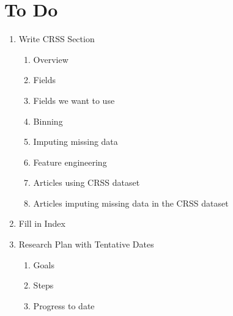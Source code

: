 \section{To Do}

\begin{enumerate}
	\item Write CRSS Section
	\begin{enumerate}[label=\alph*.]
		\item Overview
		\item Fields
		\item Fields we want to use
		\item Binning
		\item Imputing missing data
		\item Feature engineering
		\item Articles using CRSS dataset
		\item Articles imputing missing data in the CRSS dataset
	\end{enumerate}
	\item Fill in Index
	\item Research Plan with Tentative Dates
	\begin{enumerate}[label=\alph*.]
		\item Goals
		\item Steps
		\item Progress to date
	\end{enumerate}
	
\end{enumerate}